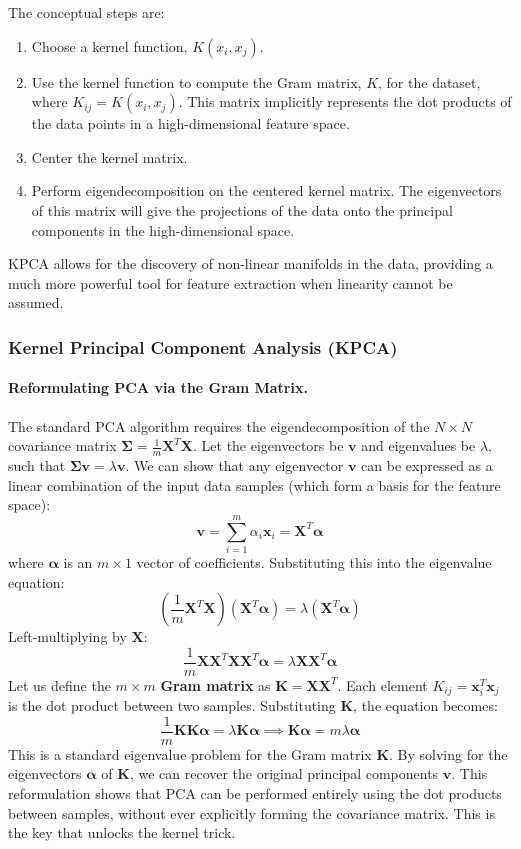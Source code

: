 The conceptual steps are:
\begin{enumerate}
    \item Choose a kernel function, $K(x_i, x_j)$.
    \item Use the kernel function to compute the Gram matrix, $K$, for the dataset, where $K_{ij} = K(x_i, x_j)$. This matrix implicitly represents the dot products of the data points in a high-dimensional feature space.
    \item Center the kernel matrix.
    \item Perform eigendecomposition on the centered kernel matrix. The eigenvectors of this matrix will give the projections of the data onto the principal components in the high-dimensional space.
\end{enumerate}
KPCA allows for the discovery of non-linear manifolds in the data, providing a much more powerful tool for feature extraction when linearity cannot be assumed.

\subsubsection{Kernel Principal Component Analysis (KPCA)}
\paragraph{Reformulating PCA via the Gram Matrix.}
The standard PCA algorithm requires the eigendecomposition of the $N \times N$ covariance matrix $\mathbf{\Sigma} = \frac{1}{m}\mathbf{X}^T\mathbf{X}$. Let the eigenvectors be $\mathbf{v}$ and eigenvalues be $\lambda$, such that $\mathbf{\Sigma}\mathbf{v} = \lambda\mathbf{v}$. We can show that any eigenvector $\mathbf{v}$ can be expressed as a linear combination of the input data samples (which form a basis for the feature space):
$$ \mathbf{v} = \sum_{i=1}^m \alpha_i \mathbf{x}_i = \mathbf{X}^T \boldsymbol{\alpha} $$
where $\boldsymbol{\alpha}$ is an $m \times 1$ vector of coefficients. Substituting this into the eigenvalue equation:
$$ \left(\frac{1}{m}\mathbf{X}^T\mathbf{X}\right)(\mathbf{X}^T\boldsymbol{\alpha}) = \lambda (\mathbf{X}^T\boldsymbol{\alpha}) $$
Left-multiplying by $\mathbf{X}$:
$$ \frac{1}{m}\mathbf{X}\mathbf{X}^T\mathbf{X}\mathbf{X}^T\boldsymbol{\alpha} = \lambda \mathbf{X}\mathbf{X}^T\boldsymbol{\alpha} $$
Let us define the $m \times m$ \textbf{Gram matrix} as $\mathbf{K} = \mathbf{X}\mathbf{X}^T$. Each element $K_{ij} = \mathbf{x}_i^T \mathbf{x}_j$ is the dot product between two samples. Substituting $\mathbf{K}$, the equation becomes:
$$ \frac{1}{m}\mathbf{K}\mathbf{K}\boldsymbol{\alpha} = \lambda \mathbf{K}\boldsymbol{\alpha} \implies \mathbf{K}\boldsymbol{\alpha} = m\lambda\boldsymbol{\alpha} $$
This is a standard eigenvalue problem for the Gram matrix $\mathbf{K}$. By solving for the eigenvectors $\boldsymbol{\alpha}$ of $\mathbf{K}$, we can recover the original principal components $\mathbf{v}$. This reformulation shows that PCA can be performed entirely using the dot products between samples, without ever explicitly forming the covariance matrix. This is the key that unlocks the kernel trick.


